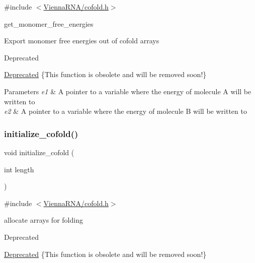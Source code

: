 {\ttfamily \#include $<$\hyperlink{cofold_8h}{Vienna\+R\+N\+A/cofold.\+h}$>$}



get\+\_\+monomer\+\_\+free\+\_\+energies 

Export monomer free energies out of cofold arrays \begin{DoxyRefDesc}{Deprecated}
\item[\hyperlink{deprecated__deprecated000037}{Deprecated}]\{This function is obsolete and will be removed soon!\}\end{DoxyRefDesc}



\begin{DoxyParams}{Parameters}
{\em e1} & A pointer to a variable where the energy of molecule A will be written to \\
\hline
{\em e2} & A pointer to a variable where the energy of molecule B will be written to \\
\hline
\end{DoxyParams}
\mbox{\label{group__mfe__global__deprecated_gafee0c32208aa2ac97338b6e3fbad7fa5}} 
\subsubsection{\texorpdfstring{initialize\+\_\+cofold()}{initialize\_cofold()}}
{\footnotesize\ttfamily void initialize\+\_\+cofold (\begin{DoxyParamCaption}\item[{int}]{length }\end{DoxyParamCaption})}



{\ttfamily \#include $<$\hyperlink{cofold_8h}{Vienna\+R\+N\+A/cofold.\+h}$>$}

allocate arrays for folding \begin{DoxyRefDesc}{Deprecated}
\item[\hyperlink{deprecated__deprecated000038}{Deprecated}]\{This function is obsolete and will be removed soon!\}\end{DoxyRefDesc}
\mbox{\label{group__mfe__global__deprecated_ga2bc41df5d71fee6fd8da9904ee65d8fb}} 
